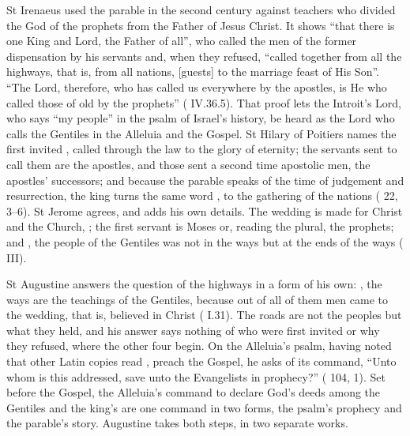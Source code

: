 St Irenaeus used the parable in the second century against teachers who divided
the God of the prophets from the Father of Jesus Christ. It shows ``that there
is one King and Lord, the Father of all'', who called the men of the former
dispensation by his servants and, when they refused, ``called together from all
the highways, that is, from all nations, [guests] to the marriage feast of His
Son''. ``The Lord, therefore, who has called us everywhere by the apostles, is
He who called those of old by the prophets'' (
IV.36.5). That proof lets the Introit's Lord, who says ``my people'' in the
psalm of Israel's history, be heard as the Lord who calls the Gentiles in the
Alleluia and the Gospel. St Hilary of Poitiers names the first invited
, called through the law to the glory of eternity; the
servants sent to call them are the apostles, and those sent a second time
apostolic men, the apostles' successors; and because the parable speaks of the
time of judgement and resurrection, the king turns the same word , to the gathering of the nations ( 22, 3--6). St Jerome agrees, and adds his own details. The wedding
is made for Christ and the Church, ; the first servant is Moses or, reading the plural, the
prophets; and , the people of the Gentiles was not in the ways but at the ends of the
ways ( III).

St Augustine answers the question of the highways in a form of his own:
, the ways are the teachings of the
Gentiles, because out of all of them men came to the wedding, that is, believed
in Christ ( I.31). The roads are not the peoples
but what they held, and his answer says nothing of who were first invited or
why they refused, where the other four begin. On the Alleluia's psalm, having
noted that other Latin copies read , preach the Gospel, he
asks of its command, ``Unto whom is this addressed, save unto the Evangelists in
prophecy?'' ( 104, 1). Set before the Gospel, the
Alleluia's command to declare God's deeds among the Gentiles and the king's
 are one command in two forms, the psalm's
prophecy and the parable's story. Augustine takes both steps, in two separate
works.

